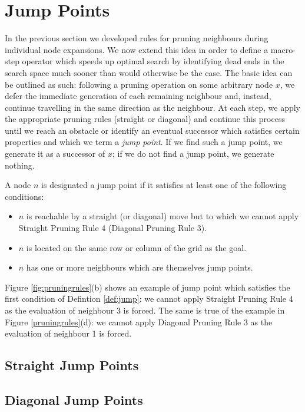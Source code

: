 \section{Jump Points}
In the previous section we developed rules for pruning neighbours during 
individual node expansions. We now extend this idea in order to define a 
macro-step operator which speeds up optimal search by identifying dead ends in the 
search space much sooner than would otherwise be the case.
The basic idea can be outlined as such:  following a pruning operation on some
arbitrary node $x$, we defer the immediate generation of each remaining
neighbour and, instead, continue travelling in the same direction as the
neighbour. At each step, we apply the appropriate pruning rules (straight or
diagonal) and continue this process until we reach an obstacle or identify an 
eventual successor which satisfies certain properties and which we term a 
\emph{jump point}.
If we find such a jump point, we generate it as a successor of $x$; if we do not 
find a jump point, we generate nothing.

\begin{definition}
\label{def:jump}
A node $n$ is designated a jump point if it satisfies at least one of the following
conditions:
\begin{itemize}
\item{$n$ is reachable by a straight (or diagonal) move but to which we
cannot apply Straight Pruning Rule 4 (Diagonal Pruning Rule 3).}
\item{$n$ is located on the same row or column of the grid as the goal.}
\item{$n$ has one or more neighbours which are themselves jump points.}
\end{itemize}
\end{definition}

\noindent
Figure \ref{fig:pruningrules}(b) shows an example of jump point which satisfies the
first condition of Defintion \ref{def:jump}: we cannot apply Straight Pruning
Rule 4 as the evaluation of neighbour 3 is forced.
The same is true of the example in Figure \ref{pruningrules}(d): we cannot
apply Diagonal Pruning Rule 3 as the evaluation of neighbour 1 is forced.


\subsection{Straight Jump Points}


\subsection{Diagonal Jump Points}




